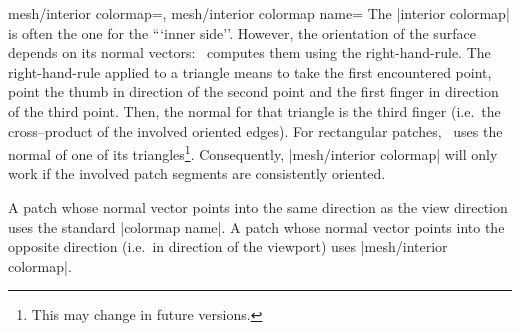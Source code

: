 {{\begin{pgfplotskeylist}{%
	mesh/interior colormap=,%
	mesh/interior colormap name=}
	\noindent The |interior colormap| is often the one for the ```inner side''. However, the orientation of the surface depends on its normal vectors: \PGFPlots\ computes them using the right-hand-rule. The right-hand-rule applied to a triangle means to take the first encountered point, point the thumb in direction of the second point and the first finger in direction of the third point. Then, the normal for that triangle is the third finger (i.e.\ the cross--product of the involved oriented edges). For rectangular patches, \PGFPlots\ uses the normal of one of its triangles\footnote{This may change in future versions.}. Consequently, |mesh/interior colormap| will only work if the involved patch segments are consistently oriented. 
	
	A patch whose normal vector points into the same direction as the view direction uses the standard |colormap name|. A patch whose normal vector points into the opposite direction (i.e.\ in direction of the viewport) uses |mesh/interior colormap|.

\pgfplotsexpensiveexample
\begin{codeexample}[]
\end{codeexample}


\end{pgfplotskeylist}}}
